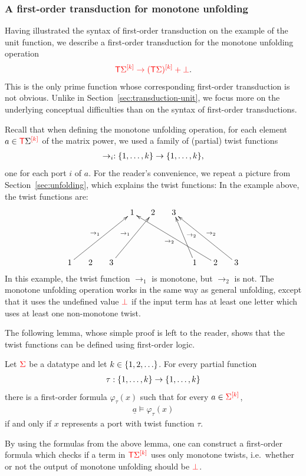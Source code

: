 \subsubsection{A first-order transduction for monotone unfolding}
\label{sec:fo-transduction-for-unfolding}
Having illustrated the syntax of first-order transduction on the example of the unit function, we describe a first-order transduction for the monotone unfolding operation 
\begin{align*}
    \ranked{\tmonad \mati k{\Sigma} \to \mati k{( \tmonad \Sigma)} + \termset}.
\end{align*}
This is the only prime function whose corresponding first-order transduction is not obvious.
Unlike in Section~\ref{sec:transduction-unit},  we focus more  on the underlying conceptual difficulties than on the syntax of first-order transductions. 

Recall  that when  defining the  monotone  unfolding operation,  for each element $a \in {\tmonad \mati k{\Sigma}}$ of the matrix power, we used a family of (partial) twist functions
\begin{align*}
\to_i : \set{1,\ldots,k} \to \set{1,\ldots,k},
\end{align*}
one for each port $i$ of $a$. For the reader's convenience, we repeat a picture from Section~\ref{sec:unfolding}, which explains the twist functions:
In the example  above, the twist functions are:
\begin{align*}
\xymatrix@C=0.5cm@R=1.7cm{
     & && 1 & 2 & 3 \\
    1\ar[urrr]^-{\to_1} & 2 & 3 \ar[urr]^-{\to_1} &&&&
    1\ar[ul]_-{\to_2} & 2\ar[ullll]^-{\to_2} & 3\ar[ulll]_-{\to_2}
}
\end{align*}
In this example, the twist function $\to_1$ is monotone, but  $\to_2$ is not. The monotone unfolding operation works in the same way as general  unfolding, except that it uses the undefined value $\termset$ if the input term has at least one letter which uses at least one non-monotone twist. 

The following lemma, whose simple proof is left to the reader, shows that the twist functions can be defined using first-order logic.
\begin{lemma}
    Let $\rSigma$ be a datatype and let $k \in \set{1,2,\ldots}$. For every partial function
    \begin{align*}
    \tau : \set{1,\ldots,k} \to \set{1,\ldots,k}
    \end{align*}
    there is a first-order formula $\varphi_\tau(x)$ such that for every $a \in \mati k \rSigma$, 
    \begin{align*}
    \underline a \models \varphi_\tau(x)
    \end{align*}
     if and only if $x$ represents a port  with twist function $\tau$.  
\end{lemma}
By using the formulas from the above lemma, one can construct  a first-order formula which checks if a term in $\tmonad \mati k \rSigma$ uses only monotone twists, i.e.~whether or not the output of monotone unfolding should be $\termset$. 

